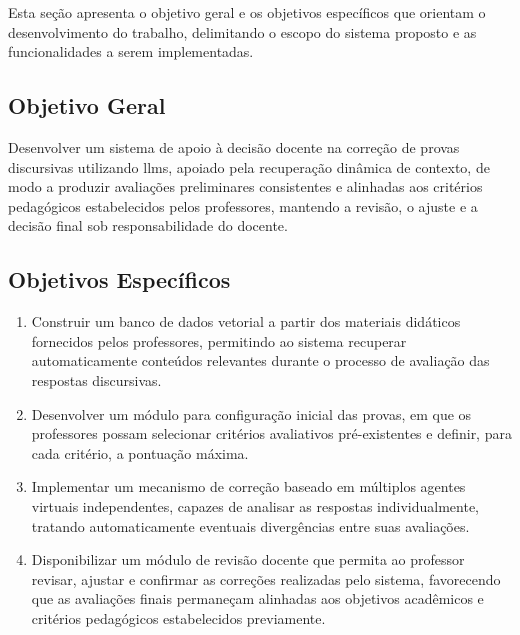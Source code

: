Esta seção apresenta o objetivo geral e os objetivos específicos que orientam o desenvolvimento do trabalho, delimitando o escopo do sistema proposto e as funcionalidades a serem implementadas.

\subsection{Objetivo Geral}
Desenvolver um sistema de apoio à decisão docente na correção de provas discursivas utilizando \gls{llm}s, apoiado pela recuperação dinâmica de contexto, de modo a produzir avaliações preliminares consistentes e alinhadas aos critérios pedagógicos estabelecidos pelos professores, mantendo a revisão, o ajuste e a decisão final sob responsabilidade do docente.

\subsection{Objetivos Específicos}
\begin{enumerate}
\item Construir um banco de dados vetorial a partir dos materiais didáticos fornecidos pelos professores, permitindo ao sistema recuperar automaticamente conteúdos relevantes durante o processo de avaliação das respostas discursivas.

\item Desenvolver um módulo para configuração inicial das provas, em que os professores possam selecionar critérios avaliativos pré-existentes e definir, para cada critério, a pontuação máxima.

\item Implementar um mecanismo de correção baseado em múltiplos agentes virtuais independentes, capazes de analisar as respostas individualmente, tratando automaticamente eventuais divergências entre suas avaliações.

\item Disponibilizar um módulo de revisão docente que permita ao professor revisar, ajustar e confirmar as correções realizadas pelo sistema, favorecendo que as avaliações finais permaneçam alinhadas aos objetivos acadêmicos e critérios pedagógicos estabelecidos previamente.


\end{enumerate}

